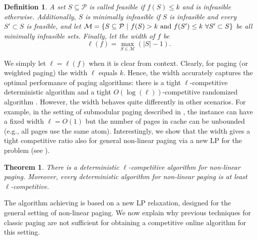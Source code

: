 \documentclass[11pt]{article}
\newcommand{\cP}{{\mathcal{P}}}
\newtheorem{definition}[thm]{Definition}
\newtheorem{theorem}[thm]{Theorem}
\begin{document}
\begin{definition}
	\label{def:Mininfeasible}
	A set $S \subseteq \cP$ is called {\em feasible} if $f(S) \leq k$ and is {\em infeasible} otherwise. Additionally, $S$ is {\em minimally  infeasible} if $S$ is infeasible and every $S' \subset S$ is feasible, and let $\mathcal{M} = \left\{S \subseteq \cP~|~f(S)>k \textnormal{ and } f(S') \leq k~\forall S' \subset S \right\}$ be all minimally infeasible sets. Finally, let the {\em width} of $f$ be $$\ell(f) = \max_{S \in \mathcal{M}} \left(|S|-1\right).$$ %
\end{definition}
We simply let $\ell = \ell(f)$ when it is clear from context. 
Clearly, for paging (or weighted paging) the width $\ell$ equals $k$. Hence, the width accurately captures the optimal performance of paging algorithms: there is a tight $\ell$-competitive deterministic algorithm \cite{sleator1985amortized} and a tight $O(\log(\ell))$-competitive randomized algorithm \cite{fiat1991competitive}. However, the width behaves quite differently in other scenarios. For example, in the setting of submodular paging described in , the instance can have a fixed width $\ell = O(1)$ but the number of pages in cache can be unbounded (e.g., all pages use the same atom). Interestingly, we show that the width gives a tight competitive ratio also for general non-linear paging via a new LP for the problem (see ).   %



\begin{theorem}
	\label{thm:deterministic}
	There is a deterministic $\ell$-competitive algorithm for \textnormal{non-linear paging}. Moreover, every deterministic algorithm for  \textnormal{non-linear paging} is at least $\ell$-competitive. 
\end{theorem}


The algorithm achieving  is based on a new LP relaxation, designed for the general setting of non-linear paging. We now explain why previous techniques for classic paging are not sufficient for obtaining a competitive online algorithm for this setting.
\end{document}

